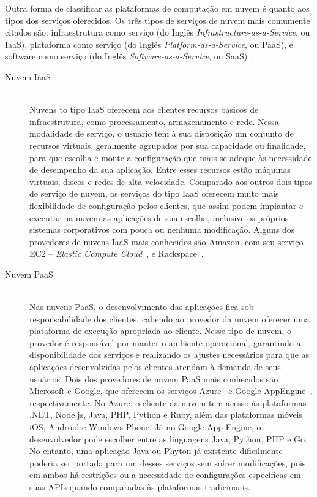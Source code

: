 Outra forma de classificar as plataformas de computação em nuvem é quanto aos tipos 
dos serviços oferecidos. Os três tipos de serviços de nuvem mais comumente citados 
são: infraestrutura como serviço (do Inglês \emph{Infrastructure-as-a-Service}, ou IaaS), plataforma como serviço (do Inglês \emph{Platform-as-a-Service}, ou PaaS), e 
software como serviço (do Inglês \emph{Software-as-a-Service}, ou SaaS)~\cite{armbrust2010view,Zhang2010}. 

\begin{description}
\item[Nuvem IaaS] \hfill \\ Nuvens to tipo IaaS oferecem 
aos clientes recursos básicos de infraestrutura, como processamento, armazenamento 
e rede. Nessa modalidade de serviço, o usuário tem à sua disposição um conjunto
de recursos virtuais, geralmente agrupados por sua capacidade ou finalidade, para
que escolha e monte a configuração que mais se adeque às necessidade de desempenho
da sua aplicação. Entre esses recursos estão máquinas virtuais, discos e redes de alta velocidade. Comparado 
aos outros dois tipos de serviço de nuvem, os serviços do tipo IaaS oferecem muito 
mais flexibilidade de configuração pelos clientes, que assim podem implantar e 
executar na nuvem as aplicações de sua escolha, inclusive os próprios sistemas 
corporativos com pouca ou nenhuma modificação. Alguns dos provedores de nuvens 
IaaS mais conhecidos são Amazon, com seu serviço EC2 -- \emph{Elastic Compute 
Cloud}~\cite{ec2}, e Rackspace~\cite{rackspace}.


\item[Nuvem PaaS] \hfill \\ Nas nuvens PaaS, o desenvolvimento 
das aplicações fica sob responsabilidade dos clientes, cabendo ao provedor da 
nuvem oferecer uma plataforma de execução apropriada ao cliente. Nesse tipo de 
nuvem, o provedor é responsável por manter o ambiente operacional, garantindo a 
disponibilidade dos serviços e realizando os ajustes necessários para que as 
aplicações desenvolvidas pelos clientes atendam à demanda de seus usuários. 
Dois dos provedores de nuvem PaaS mais conhecidos são Microsoft e Google, que 
oferecem os serviços Azure~\cite{azure} e Google AppEngine~\cite{appengine}, 
respectivamente. No Azure, o cliente da nuvem tem acesso às plataformas 
.NET, Node.js, Java, PHP, Python e Ruby, além das plataformas móveis iOS, Android
e Windows Phone. Já no Google App Engine, o desenvolvedor pode escolher entre 
as linguagens Java, Python, PHP e Go. No entanto, uma aplicação Java ou Phyton 
já existente dificilmente poderia ser portada para um desses serviços sem sofrer 
modificações, pois em ambos há restrições ou a necessidade de configurações específicas
em suas APIs quando comparadas às plataformas tradicionais.


\end{description}
